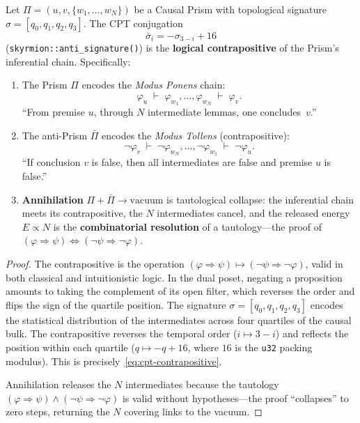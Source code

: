 \begin{theorem}
\label{thm:antimatter-tollens}
Let $\Pi = (u, v, \{w_1, \ldots, w_N\})$ be a Causal Prism with
topological signature $\sigma = [q_0, q_1, q_2, q_3]$. The CPT
conjugation
\begin{equation}
  \bar{\sigma}_i = -\sigma_{3-i} + 16
  \label{eq:cpt-contrapositive}
\end{equation}
(\texttt{skyrmion::anti\_signature()}) is the \textbf{logical
contrapositive} of the Prism's inferential chain. Specifically:

\begin{enumerate}
  \item The Prism $\Pi$ encodes the \emph{Modus Ponens} chain:
    \begin{equation}
      \varphi_u \;\vdash\; \varphi_{w_1}, \ldots, \varphi_{w_N}
      \;\vdash\; \varphi_v.
    \end{equation}
    ``From premise $u$, through $N$ intermediate lemmas, one
    concludes~$v$.''
  \item The anti-Prism $\bar{\Pi}$ encodes the \emph{Modus Tollens}
    (contrapositive):
    \begin{equation}
      \neg\varphi_v \;\vdash\; \neg\varphi_{w_N}, \ldots,
      \neg\varphi_{w_1} \;\vdash\; \neg\varphi_u.
    \end{equation}
    ``If conclusion $v$ is false, then all
    intermediates are false and premise $u$ is false.''
  \item \textbf{Annihilation} $\Pi + \bar{\Pi} \to \text{vacuum}$
    is tautological collapse: the inferential chain meets
    its contrapositive, the $N$ intermediates cancel, and
    the released energy $E \propto N$ is the \textbf{combinatorial
    resolution} of a tautology---the proof of
    $(\varphi \Rightarrow \psi) \Leftrightarrow
    (\neg\psi \Rightarrow \neg\varphi)$.
\end{enumerate}
\end{theorem}

\begin{proof}
The contrapositive is the operation $(\varphi \Rightarrow \psi)
\mapsto (\neg\psi \Rightarrow \neg\varphi)$, valid in
both classical and intuitionistic logic. In the dual poset, negating a
proposition amounts to taking the complement of its open filter,
which reverses the order and flips the sign of the quartile
position. The signature $\sigma = [q_0, q_1, q_2, q_3]$ encodes the
statistical distribution of the intermediates across four quartiles
of the causal bulk. The contrapositive reverses the temporal order
($i \mapsto 3 - i$) and reflects the position within each quartile
($q \mapsto -q + 16$, where $16$ is the \texttt{u32} packing
modulus). This is precisely~\eqref{eq:cpt-contrapositive}.

Annihilation releases the $N$ intermediates because the tautology
$(\varphi \Rightarrow \psi) \wedge (\neg\psi \Rightarrow
\neg\varphi)$ is valid without hypotheses---the proof ``collapses''
to zero steps, returning the $N$ covering links to the vacuum.
\end{proof}

